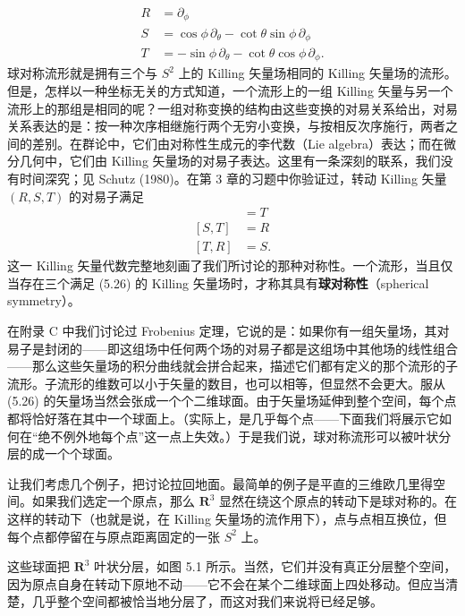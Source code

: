 \begin{align*}
R &= \partial_\phi\\
S &= \cos\phi\,\partial_\theta - \cot\theta\sin\phi\,\partial_\phi\\
T &= -\sin\phi\,\partial_\theta - \cot\theta\cos\phi\,\partial_\phi.
\tag{5.25}
\end{align*}
球对称流形就是拥有三个与 $S^2$ 上的 Killing 矢量场相同的 Killing 矢量场的流形。但是，怎样以一种坐标无关的方式知道，一个流形上的一组 Killing 矢量与另一个流形上的那组是相同的呢？一组对称变换的结构由这些变换的对易关系给出，对易关系表达的是：按一种次序相继施行两个无穷小变换，与按相反次序施行，两者之间的差别。在群论中，它们由对称性生成元的李代数（Lie algebra）表达；而在微分几何中，它们由 Killing 矢量场的对易子表达。这里有一条深刻的联系，我们没有时间深究；见 Schutz (1980)。在第 3 章的习题中你验证过，转动 Killing 矢量 $(R, S, T)$ 的对易子满足
\begin{align*}
[R, S] &= T\\
[S, T] &= R\\
[T, R] &= S.
\tag{5.26}
\end{align*}
这一 Killing 矢量代数完整地刻画了我们所讨论的那种对称性。一个流形，当且仅当存在三个满足 (5.26) 的 Killing 矢量场时，才称其具有\textbf{球对称性}（spherical symmetry）。

在附录 C 中我们讨论过 Frobenius 定理，它说的是：如果你有一组矢量场，其对易子是封闭的——即这组场中任何两个场的对易子都是这组场中其他场的线性组合——那么这些矢量场的积分曲线就会拼合起来，描述它们都有定义的那个流形的子流形。子流形的维数可以小于矢量的数目，也可以相等，但显然不会更大。服从 (5.26) 的矢量场当然会张成一个个二维球面。由于矢量场延伸到整个空间，每个点都将恰好落在其中一个球面上。（实际上，是几乎每个点——下面我们将展示它如何在“绝不例外地每个点”这一点上失效。）于是我们说，球对称流形可以被叶状分层的成一个个球面。


让我们考虑几个例子，把讨论拉回地面。最简单的例子是平直的三维欧几里得空间。如果我们选定一个原点，那么 $\mathbf{R}^3$ 显然在绕这个原点的转动下是球对称的。在这样的转动下（也就是说，在 Killing 矢量场的流作用下），点与点相互换位，但每个点都停留在与原点距离固定的一张 $S^2$ 上。

这些球面把 $\mathbf{R}^3$ 叶状分层，如图 5.1 所示。当然，它们并没有真正分层整个空间，因为原点自身在转动下原地不动——它不会在某个二维球面上四处移动。但应当清楚，几乎整个空间都被恰当地分层了，而这对我们来说将已经足够。


